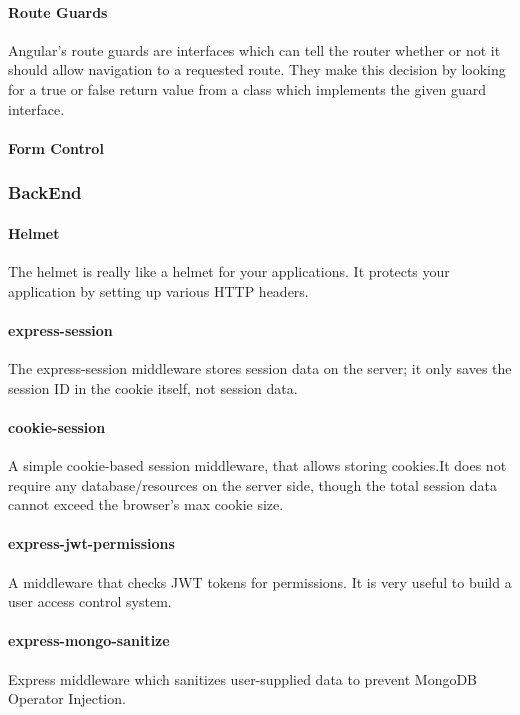 \paragraph*{Route Guards}
Angular’s route guards are interfaces which can tell the router whether or not it should allow navigation to a requested route. They make this decision by looking for a true or false return value from a class which implements the given guard interface.
\paragraph*{Form Control}

\subsubsection{BackEnd}
\paragraph*{Helmet}
The helmet is really like a helmet for your applications. It protects your application by setting up various HTTP headers.
\paragraph*{express-session}
The express-session middleware stores session data on the server; it only saves the session ID in the cookie itself, not session data.

\paragraph*{cookie-session}
A simple cookie-based session middleware, that allows storing cookies.It does not require any database/resources on the server side, though the total session data cannot exceed the browser’s max cookie size.

\paragraph*{express-jwt-permissions}
A middleware that checks \ac{JWT} tokens for permissions. It is very useful to build a user access control system.

\paragraph*{express-mongo-sanitize}
Express middleware which sanitizes user-supplied data to prevent MongoDB Operator Injection.

